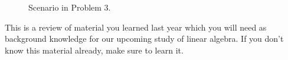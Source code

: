 \documentclass[../textbook.tex]{subfiles}
\begin{document}
\begin{figure}[h]
\begin{center}
\begin{minipage}[b]{\textwidth}
\begin{asy}[width=0.5\textwidth]
			\end{asy}
		\end{minipage}
	\end{center}
	\vspace*{-2\baselineskip}
	\begin{center}
		\begin{minipage}[t]{\textwidth}
			\caption{Scenario in Problem 3.}
			\label{fig:unit_circle}
		\end{minipage}\hfill
	\end{center}
	\vspace*{-2\baselineskip}
\end{figure}

\noindent This is a review of material you learned last year which you will need as background knowledge for our upcoming study of linear algebra. If you don't know this material already, make sure to learn it.
\end{document}
